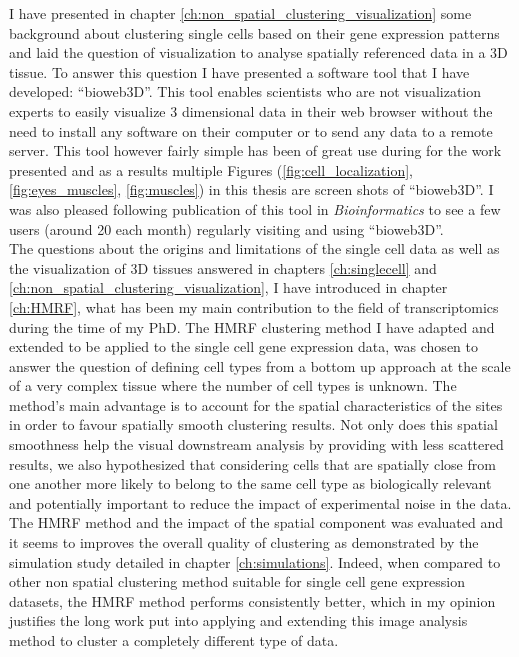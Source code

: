 I have presented in chapter \ref{ch:non_spatial_clustering_visualization} some background about clustering single cells based on their gene expression patterns and laid the question of visualization to analyse spatially referenced data in a 3D tissue. To answer this question I have presented a software tool that I have developed: ``bioweb3D''. This tool enables scientists who are not visualization experts to easily visualize 3 dimensional data in their web browser without the need to install any software on their computer or to send any data to a remote server. This tool however fairly simple has been of great use during for the work presented and as a results multiple Figures (\ref{fig:cell_localization}, \ref{fig:eyes_muscles}, \ref{fig:muscles}) in this thesis are screen shots of ``bioweb3D''. I was also pleased following publication of this tool in \emph{Bioinformatics} \cite{Pettit13} to see a few users (around 20 each month) regularly visiting and using ``bioweb3D''.\\

The questions about the origins and limitations of the single cell data as well as the visualization of 3D tissues answered in chapters \ref{ch:singlecell} and \ref{ch:non_spatial_clustering_visualization}, I have introduced in chapter \ref{ch:HMRF}, what has been my main contribution to the field of transcriptomics during the time of my PhD. The HMRF clustering method I have adapted and extended to be applied to the single cell gene expression data, was chosen to answer the question of defining cell types from a bottom up approach at the scale of a very complex tissue where the number of cell types is unknown. The method's main advantage is to account for the spatial characteristics of the sites in order to favour spatially smooth clustering results. Not only does this spatial smoothness help the visual downstream analysis by providing with less scattered results, we also hypothesized that considering cells that are spatially close from one another more likely to belong to the same cell type as biologically relevant and potentially important to reduce the impact of experimental noise in the data.\\

 The HMRF method and the impact of the spatial component was evaluated and it seems to improves the overall quality of clustering as demonstrated by the simulation study detailed in chapter \ref{ch:simulations}. Indeed, when compared to other non spatial clustering method suitable for single cell gene expression datasets, the HMRF method performs consistently better, which in my opinion justifies the long work put into applying and extending this image analysis method to cluster a completely different type of data. \\
 
